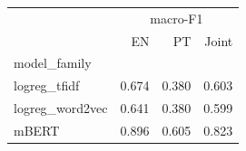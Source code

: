 \begin{tabular}{lrrr}
\toprule
 & \multicolumn{3}{c}{macro-F1} \\
 & EN & PT & Joint \\
model\_family &  &  &  \\
\midrule
logreg\_tfidf & 0.674 & 0.380 & 0.603 \\
logreg\_word2vec & 0.641 & 0.380 & 0.599 \\
mBERT & 0.896 & 0.605 & 0.823 \\
\bottomrule
\end{tabular}
